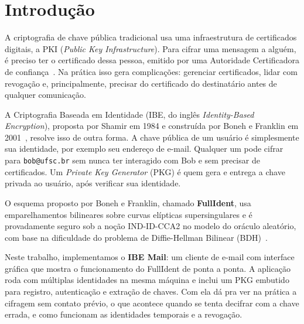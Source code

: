 \chapter{Introdução}
\label{cap:introducao}

A criptografia de chave pública tradicional usa uma infraestrutura de certificados digitais,
a PKI (\textit{Public Key Infrastructure}). Para cifrar uma mensagem a alguém, é preciso ter
o certificado dessa pessoa, emitido por uma Autoridade Certificadora de
confiança~\cite{menezes2009intro}. Na prática isso gera complicações: gerenciar certificados,
lidar com revogação e, principalmente, precisar do certificado do destinatário antes de
qualquer comunicação.

A Criptografia Baseada em Identidade (IBE, do inglês \textit{Identity-Based Encryption}),
proposta por Shamir em 1984 e construída por Boneh e Franklin em 2001~\cite{boneh2001ibe},
resolve isso de outra forma. A chave pública de um usuário é simplesmente sua identidade,
por exemplo seu endereço de e-mail. Qualquer um pode cifrar para \texttt{bob@ufsc.br} sem
nunca ter interagido com Bob e sem precisar de certificados. Um \textit{Private Key Generator}
(PKG) é quem gera e entrega a chave privada ao usuário, após verificar sua identidade.

O esquema proposto por Boneh e Franklin, chamado \textbf{FullIdent}, usa emparelhamentos
bilineares sobre curvas elípticas supersingulares e é provadamente seguro sob a noção
IND-ID-CCA2 no modelo do oráculo aleatório, com base na dificuldade do problema de
Diffie-Hellman Bilinear (BDH)~\cite{boneh2001ibe}.

Neste trabalho, implementamos o \textbf{IBE Mail}: um cliente de e-mail com interface
gráfica que mostra o funcionamento do FullIdent de ponta a ponta. A aplicação roda com
múltiplas identidades na mesma máquina e inclui um PKG embutido para registro, autenticação
e extração de chaves. Com ela dá pra ver na prática a cifragem sem contato prévio, o que
acontece quando se tenta decifrar com a chave errada, e como funcionam as identidades
temporais e a revogação.
